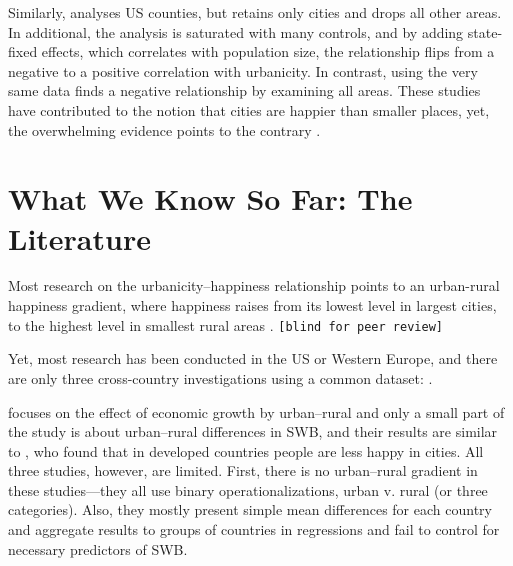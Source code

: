 \documentclass[10pt, letterpaper]{article}
\begin{document}
Similarly, \cite{glaeser14} analyses US counties, but retains only cities and drops all other areas. In additional, the analysis is saturated with many controls, and by adding state-fixed effects, which correlates with population size, the relationship flips from a negative to a positive correlation with urbanicity. In contrast, \cite{aok_brfss_city_csize16} using the very same data finds a negative relationship by examining all areas. 
These studies have contributed to the notion that cities are happier than smaller places, yet, the overwhelming evidence points to the contrary \citep{gurin60,campbell76etal,aok11a,aok_brfss_city_cize16,senior_ny_sep16_14,ons11,ibt13,morrison15,lenzi16D,morrison11,aok20}.



\section{What We Know So Far: The Literature}

Most research on the urbanicity--happiness relationship points to an urban-rural happiness gradient, where happiness raises from its lowest level in largest cities, to the highest level in smallest rural areas
\citep[e.g.,][]{campbell76etal,aok11a, aok_brfss_city_cize16,aok20}. \texttt{[blind for peer review]} %

Yet, most research has been conducted in the US or Western Europe, and there are only three cross-country investigations using a common dataset: \citet{aokcities,easterlin10al,burger20}.

\citet{easterlin10al} focuses on the effect of economic growth by urban--rural and only a small part of the study is about urban--rural differences in SWB, and their results are similar to \citet{aokcities}, who found that in developed countries people are less happy in cities. All three studies, however, are limited. 
%
First, there is no urban--rural gradient in these studies---they all use binary operationalizations, urban v. rural (or three categories). Also, they mostly present simple mean differences for each country and aggregate results to groups of countries in regressions and fail to control for necessary predictors of SWB. 
\end{document}
